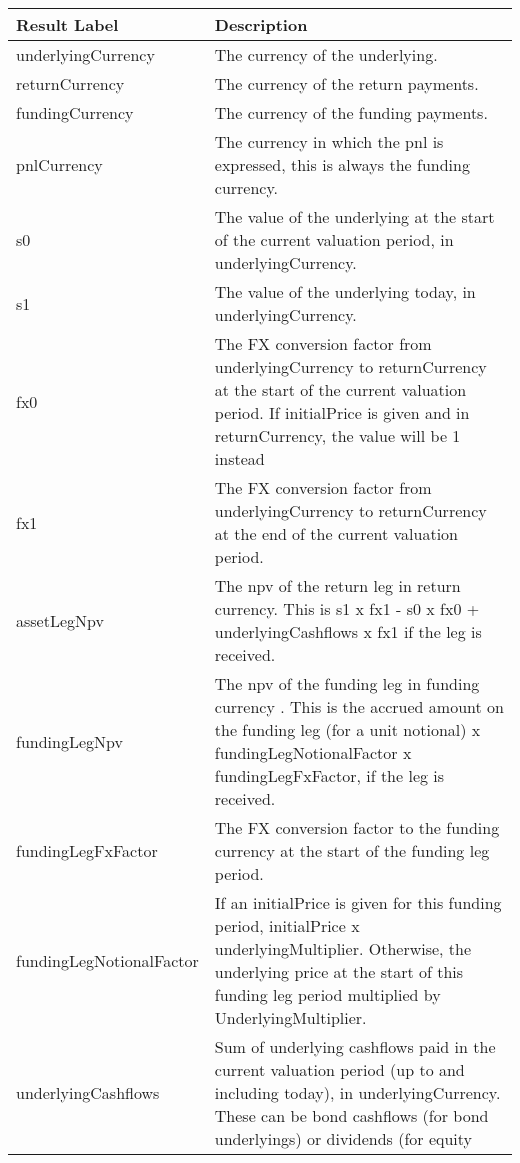 \begin{table}[H]
\begin{center}
\begin{tabular}{|p{5cm}|p{10cm}|}
  \hline
  Result Label & Description \\
  \hline
  underlyingCurrency & The currency of the underlying. \\
  \hline
  returnCurrency & The currency of the return payments. \\
  \hline
  fundingCurrency & The currency of the funding payments. \\
  \hline
  pnlCurrency & The currency in which the pnl is expressed, this is always the funding currency. \\
  \hline
  s0 & The value of the underlying at the start of the current valuation period, in underlyingCurrency. \\
  \hline
  s1 & The value of the underlying today, in underlyingCurrency. \\
  \hline
  fx0 & The FX conversion factor from underlyingCurrency to returnCurrency at the start of the current valuation period.
        If initialPrice is given and in returnCurrency, the value will be 1 instead\\
  \hline
  fx1 & The FX conversion factor from underlyingCurrency to returnCurrency at the end of the current valuation period.  \\
  \hline
  assetLegNpv & The npv of the return leg in return currency. This is s1 x fx1 - s0 x fx0 + underlyingCashflows x fx1 if the leg is received. \\
  \hline
  fundingLegNpv & The npv of the funding leg in funding currency . This is the accrued amount on the funding leg (for a unit notional) x
                  fundingLegNotionalFactor x fundingLegFxFactor, if the leg is received. \\
  \hline
  fundingLegFxFactor & The FX conversion factor to the funding currency at the start of the funding leg period.  \\
  \hline
  fundingLegNotionalFactor & If an initialPrice is given for this funding period, initialPrice x underlyingMultiplier. Otherwise, the underlying price at the start of this funding leg period multiplied by UnderlyingMultiplier. \\
  \hline
  underlyingCashflows & Sum of underlying cashflows paid in the current valuation period (up to and including today), in
                        underlyingCurrency. These can be bond cashflows (for bond underlyings) or dividends (for equity

\end{tabular}
\end{center}
\end{table}
